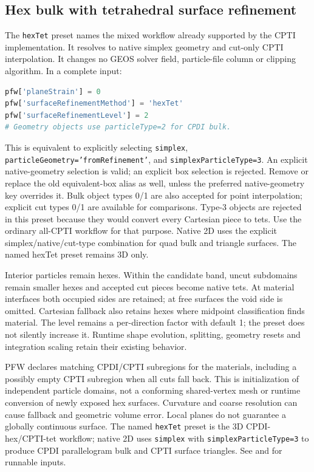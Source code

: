 \subsection{Hex bulk with tetrahedral surface refinement}
The \texttt{hexTet} preset names the mixed workflow already supported by the
CPTI implementation. It resolves to native simplex geometry and cut-only CPTI
interpolation. It changes no GEOS solver field, particle-file column or clipping
algorithm. In a complete input:
\begin{lstlisting}[language=Python,caption={CPDI hex bulk with CPTI surface/interface tets.}]
pfw['planeStrain'] = 0
pfw['surfaceRefinementMethod'] = 'hexTet'
pfw['surfaceRefinementLevel'] = 2
# Geometry objects use particleType=2 for CPDI bulk.
\end{lstlisting}
This is equivalent to explicitly selecting \texttt{simplex},
\texttt{particleGeometry='fromRefinement'}, and \texttt{simplexParticleType=3}.
An explicit native-geometry selection is valid; an explicit box selection is
rejected. Remove or replace the old equivalent-box alias as well, unless the
preferred native-geometry key overrides it. Bulk object types 0/1 are also
accepted for point interpolation; explicit cut types 0/1 are available for
comparisons. Type-3 objects are rejected in this preset because they would
convert every Cartesian piece to tets. Use the ordinary all-CPTI workflow for
that purpose. Native 2D uses the explicit simplex/native/cut-type combination for quad bulk
and triangle surfaces. The named hexTet preset remains 3D only.

Interior particles remain hexes. Within the candidate band, uncut subdomains
remain smaller hexes and accepted cut pieces become native tets. At material
interfaces both occupied sides are retained; at free surfaces the void side is
omitted. Cartesian fallback also retains hexes where midpoint classification
finds material. The level remains a per-direction factor with default 1; the
preset does not silently increase it. Runtime shape evolution, splitting,
geometry resets and integration scaling retain their existing behavior.

PFW declares matching CPDI/CPTI subregions for the materials, including a possibly empty CPTI subregion when all cuts fall back. This is initialization of independent particle domains, not a conforming shared-vertex mesh or runtime conversion of newly exposed hex surfaces. Curvature and coarse resolution can cause fallback and geometric volume error. Local planes do not guarantee a globally continuous surface. The named \texttt{hexTet} preset is the 3D CPDI-hex/CPTI-tet workflow; native 2D uses \texttt{simplex} with \texttt{simplexParticleType=3} to produce CPDI parallelogram bulk and CPTI surface triangles. See  and  for runnable inputs.


